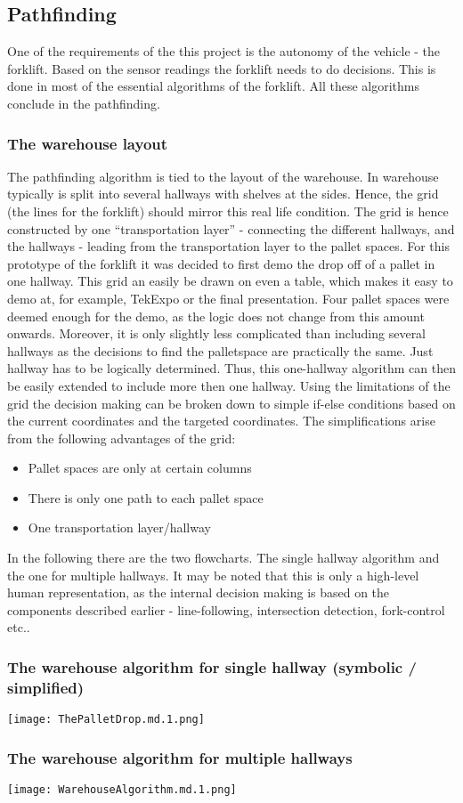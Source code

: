 \documentclass[../report.tex]{subfiles}
\begin{document}
\subsection{Pathfinding}

One of the requirements of the this project is the autonomy of the vehicle - the forklift.
Based on the sensor readings the forklift needs to do decisions. This is done in most of
the essential algorithms of the forklift. All these algorithms conclude in the pathfinding.

\subsubsection{The warehouse layout}

The pathfinding algorithm is tied to the layout of the warehouse.
In warehouse typically is split into several hallways with shelves
at the sides. Hence, the grid (the lines for the forklift) should mirror this
real life condition. The grid is hence constructed 
by one ``transportation layer'' - connecting the different hallways, and the 
hallways - leading from the transportation layer to the pallet spaces. 
For this prototype of the forklift it was decided 
to first demo the drop off of a pallet in one hallway. This grid an easily be 
drawn on even a table, which makes it easy to demo at, for example, TekExpo or 
the final presentation. Four pallet spaces were deemed enough for the demo, as the logic
does not change from this amount onwards.
Moreover, it is only slightly less complicated
than including several hallways as the decisions to find the palletspace are 
practically the same. Just hallway has to be logically determined. Thus, this one-hallway algorithm
can then be easily extended to include more then one hallway. Using the limitations of
the grid the decision making can be broken down to simple if-else conditions 
based on the current coordinates and the targeted coordinates. The simplifications
arise from the following advantages of the grid:

\begin{itemize}
    \item Pallet spaces are only at certain columns
    \item There is only one path to each pallet space
    \item One transportation layer/hallway
\end{itemize}

In the following there are the two flowcharts. The single hallway algorithm
and the one for multiple hallways. It may be noted that this is only a 
high-level human representation, as the internal decision making is based
on the components described earlier - line-following, intersection detection, fork-control
etc..

\subsubsection{The warehouse algorithm for single hallway (symbolic / simplified)}
\texttt{[image: ThePalletDrop.md.1.png]}
\subsubsection{The warehouse algorithm for multiple hallways}
\texttt{[image: WarehouseAlgorithm.md.1.png]}
\end{document}
